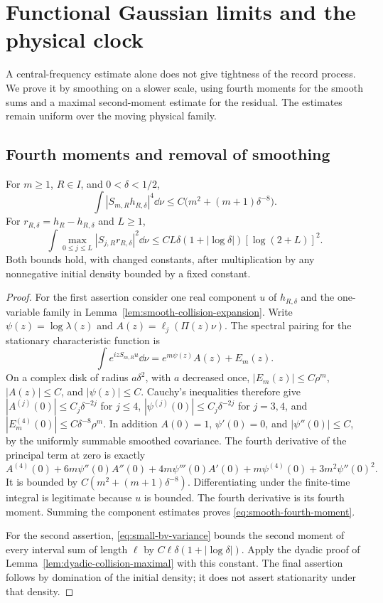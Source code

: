 \section{Functional Gaussian limits and the physical clock}
\label{sec:functional-gaussian}
A central-frequency estimate alone does not give tightness of the record
process. We prove it by smoothing on a slower scale, using fourth moments
for the smooth sums and a maximal second-moment estimate for the residual.
The estimates remain uniform over the moving physical family.

\subsection{Fourth moments and removal of smoothing}
\begin{lemma}
\label{lem:smooth-fourth-moment}
For $m\ge1$, $R\in I$, and $0<\delta<1/2$,
\begin{equation}\label{eq:smooth-fourth-moment}
 \int |S_{m,R}h_{R,\delta}|^4\dd\nu
       \le C\bigl(m^2+(m+1)\delta^{-8}\bigr).
\end{equation}
For $r_{R,\delta}=h_R-h_{R,\delta}$ and $L\ge1$,
\begin{equation}\label{eq:residual-process-maximal}
 \int\max_{0\le j\le L}|S_{j,R}r_{R,\delta}|^2\dd\nu
 \le CL\delta(1+|\log\delta|)[\log(2+L)]^2.
\end{equation}
Both bounds hold, with changed constants, after multiplication by any
nonnegative initial density bounded by a fixed constant.
\end{lemma}
\begin{proof}
For the first assertion consider one real component $u$ of
$h_{R,\delta}$ and the one-variable family in
Lemma~\ref{lem:smooth-collision-expansion}. Write
$\psi(z)=\log\lambda(z)$ and $A(z)=\ell_j(\Pi(z)\nu)$. The spectral
pairing for the stationary characteristic function is
\[
 \int e^{izS_{m,R}u}\dd\nu=e^{m\psi(z)}A(z)+E_m(z).
\]
On a complex disk of radius $a\delta^2$, with $a$ decreased once,
$|E_m(z)|\le C\rho^m$, $|A(z)|\le C$, and $|\psi(z)|\le C$.
Cauchy's inequalities therefore give
$|A^{(j)}(0)|\le C_j\delta^{-2j}$ for $j\le4$,
$|\psi^{(j)}(0)|\le C_j\delta^{-2j}$ for $j=3,4$, and
$|E_m^{(4)}(0)|\le C\delta^{-8}\rho^m$.
In addition $A(0)=1$, $\psi'(0)=0$, and
$|\psi''(0)|\le C$, by the uniformly summable smoothed covariance.
The fourth derivative of the principal term at zero is exactly
\[
 A^{(4)}(0)+6m\psi''(0)A''(0)+4m\psi'''(0)A'(0)
       +m\psi^{(4)}(0)+3m^2\psi''(0)^2.
\]
It is bounded by $C(m^2+(m+1)\delta^{-8})$. Differentiating under the
finite-time integral is legitimate because $u$ is bounded. The fourth
derivative is its fourth moment. Summing the component estimates proves
\eqref{eq:smooth-fourth-moment}.

For the second assertion, \eqref{eq:small-bv-variance} bounds the second
moment of every interval sum of length $\ell$ by
$C\ell\delta(1+|\log\delta|)$. Apply the dyadic proof of
Lemma~\ref{lem:dyadic-collision-maximal} with this constant. The final
assertion follows by domination of the initial density; it does not
assert stationarity under that density.
\end{proof}

